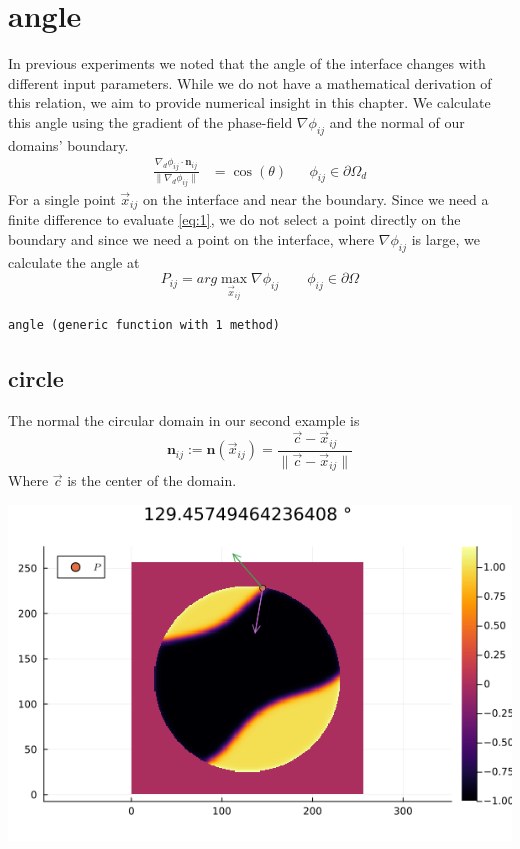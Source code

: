 \documentclass{mimosis}
\begin{document}
\chapter{angle}
\label{sec:org214e230}
In previous experiments we noted that the angle of the interface changes with different input parameters. While we do not have a mathematical derivation of this relation, we aim to provide numerical insight in this chapter. We calculate this angle using the gradient of the phase-field \(\nabla \phi_{ij}\) and the normal of our domains' boundary.
\begin{align}
\label{eq:1}
\frac{\nabla_d \phi_{ij} \cdot \mathbf{n}_{ij}}{\|\nabla_{d} \phi_{ij}\|} &= \cos(\theta)& & \phi_{ij} \in \partial\Omega_{d}
\end{align}
For a single point \(\vec{x}_{ij}\) on the interface and near the boundary. Since we need a finite difference to evaluate \ref{eq:1}, we do not select a point directly on the boundary and since we need a point on the interface, where \(\nabla \phi_{ij}\) is large, we calculate the angle at
\begin{equation}
\label{eq:2}
P_{ij} = arg\max_{\vec{x}_{ij}} \nabla \phi_{ij} \qquad \phi_{ij} \in \partial \Omega
\end{equation}
\label{angle-function}
\begin{verbatim}
angle (generic function with 1 method)
\end{verbatim}
\section{circle}
\label{sec:org7d89b0f}
The normal the circular domain in our second example is
\begin{equation}
\label{eq:3}
\mathbf{n}_{ij} := \mathbf{n}(\vec{x}_{ij}) = \frac{\vec{c} - \vec{x}_{ij}}{\| \vec{c} - \vec{x}_{ij}\|}
\end{equation}
Where \(\vec{c}\) is the center of the domain.
\begin{center}
\includegraphics[width=.9\linewidth]{images/angle.png}
\label{angle-on-circle}
\end{center}
\end{document}
